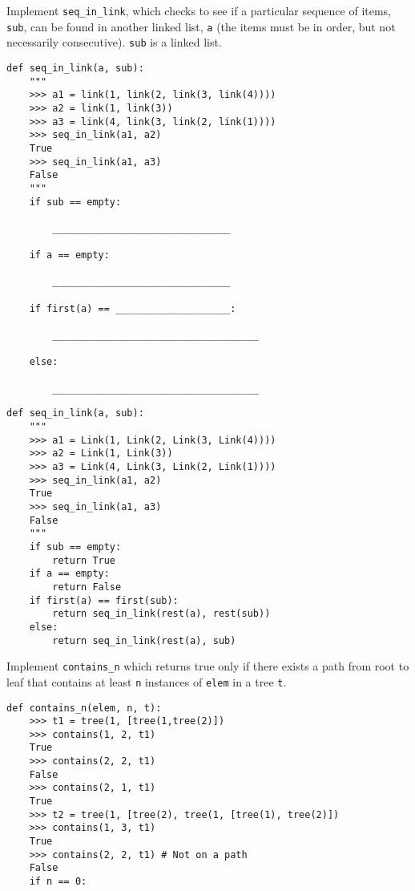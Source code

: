 \documentclass{exam}
\begin{document}
\begin{questions}
\question Implement \lstinline$seq_in_link$, which checks to see if a particular sequence of items, \lstinline$sub$, can be found in another linked list, \lstinline$a$ (the items must be in order, but not necessarily consecutive). \lstinline$sub$ is a linked list.

\ifprintanswers\else
\begin{lstlisting}
def seq_in_link(a, sub):
    """
    >>> a1 = link(1, link(2, link(3, link(4))))
    >>> a2 = link(1, link(3))
    >>> a3 = link(4, link(3, link(2, link(1))))
    >>> seq_in_link(a1, a2)
    True
    >>> seq_in_link(a1, a3)
    False
    """
    if sub == empty:

        _______________________________ 

    if a == empty:
	
        _______________________________ 

    if first(a) == ____________________:
	
        ____________________________________ 

    else: 

        ____________________________________ 
\end{lstlisting}
\fi

\begin{solution}
\begin{lstlisting}
def seq_in_link(a, sub):
    """
    >>> a1 = Link(1, Link(2, Link(3, Link(4))))
    >>> a2 = Link(1, Link(3))
    >>> a3 = Link(4, Link(3, Link(2, Link(1))))
    >>> seq_in_link(a1, a2)
    True
    >>> seq_in_link(a1, a3)
    False
    """
    if sub == empty:
        return True
    if a == empty:
        return False
    if first(a) == first(sub):
        return seq_in_link(rest(a), rest(sub))
    else: 
        return seq_in_link(rest(a), sub)
\end{lstlisting}
\end{solution}

\question Implement \lstinline$contains_n$ which returns true only if there exists a path from root to leaf that contains at least \lstinline$n$ instances of \lstinline$elem$ in a tree \lstinline$t$.

\ifprintanswers\else
\begin{lstlisting}
def contains_n(elem, n, t):
    >>> t1 = tree(1, [tree(1,tree(2)])
    >>> contains(1, 2, t1)
    True
    >>> contains(2, 2, t1)
    False
    >>> contains(2, 1, t1)
    True
    >>> t2 = tree(1, [tree(2), tree(1, [tree(1), tree(2)])
    >>> contains(1, 3, t1)
    True
    >>> contains(2, 2, t1) # Not on a path
    False
    if n == 0:
    

\end{lstlisting}
\end{questions}
\end{document}
